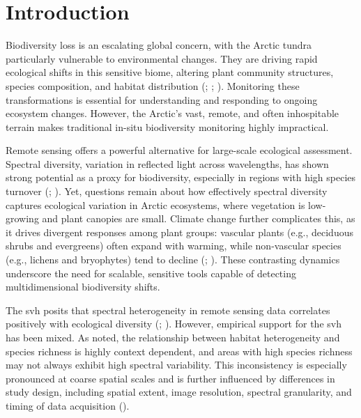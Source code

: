 \chapter{Introduction} %
\label{Chapter1}

Biodiversity loss is an escalating global concern, with the Arctic tundra particularly vulnerable to environmental changes. They are driving rapid ecological shifts in this sensitive biome, altering plant community structures, species composition, and habitat distribution (\cite{garcia_criado_plant_2025}; \cite{bjorkman_status_2019}; \cite{wenzl_vegetation_2024}). Monitoring these transformations is essential for understanding and responding to ongoing ecosystem changes. However, the Arctic’s vast, remote, and often inhospitable terrain makes traditional in-situ biodiversity monitoring highly impractical.

Remote sensing offers a powerful alternative for large-scale ecological assessment. Spectral diversity, variation in reflected light across wavelengths, has shown strong potential as a proxy for biodiversity, especially in regions with high species turnover (\cite{elisa_van_cleemput_making_2022}; \cite{pijnenburg_mapping_2023}). Yet, questions remain about how effectively spectral diversity captures ecological variation in Arctic ecosystems, where vegetation is low-growing and plant canopies are small. Climate change further complicates this, as it drives divergent responses among plant groups: vascular plants (e.g., deciduous shrubs and evergreens) often expand with warming, while non-vascular species (e.g., lichens and bryophytes) tend to decline (\cite{garcia_criado_plant_2025}; \cite{bjorkman_status_2019}). These contrasting dynamics underscore the need for scalable, sensitive tools capable of detecting multidimensional biodiversity shifts.

The \ac{svh} posits that spectral heterogeneity in remote sensing data correlates positively with ecological diversity (\cite{palmer_quantitative_2002}; \cite{schmidtlein_spectral_2017}). However, empirical support for the \ac{svh} has been mixed. As \cite{palmer_quantitative_2002} noted, the relationship between habitat heterogeneity and species richness is highly context dependent, and areas with high species richness may not always exhibit high spectral variability. This inconsistency is especially pronounced at coarse spatial scales and is further influenced by differences in study design, including spatial extent, image resolution, spectral granularity, and timing of data acquisition (\cite{rocchini_remotely_2010}).

